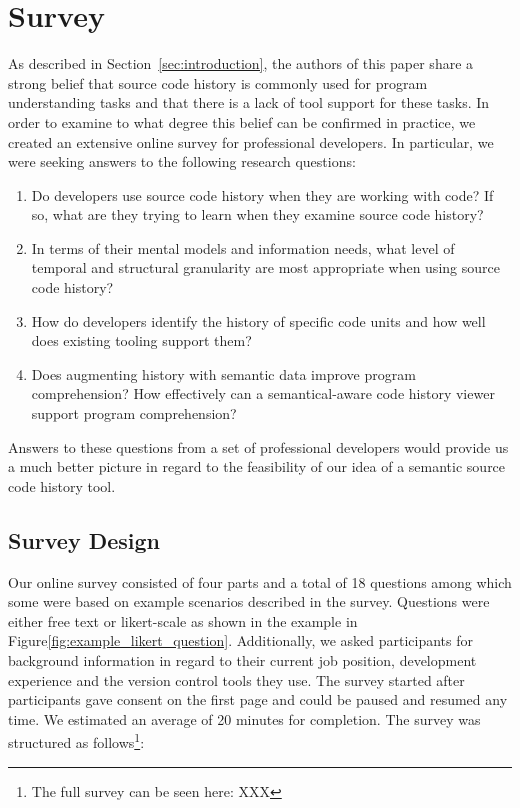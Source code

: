 
\section{Survey}
\label{sec:survey}

As described in Section~\ref{sec:introduction}, the authors of this paper share a strong belief that source code history is commonly used for program understanding tasks and that there is a lack of tool support for these tasks. In order to examine to what degree this belief can be confirmed in practice, we created an extensive online survey for professional developers. In particular, we were seeking answers to the following research questions:

\begin{enumerate}[label=\textbf{RQ\arabic*}, labelindent=\parindent, listparindent=\parindent]
	\item Do developers use source code history when they are working with code? If so, what are they trying to learn when they examine source code history?
	\item In terms of their mental models and information needs, what level of temporal and structural granularity are most appropriate when using source code history?
	\item How do developers identify the history of specific code units and how well does existing tooling support them?
	\item Does augmenting history with semantic data improve program comprehension? How effectively can a semantical-aware code history viewer support program comprehension?
\end{enumerate}

\noindent Answers to these questions from a set of professional developers would provide us a much better picture in regard to the feasibility of our idea of a semantic source code history tool.

\subsection{Survey Design}
\label{sec:survey-design}

Our online survey consisted of four parts and a total of 18 questions among which some were based on example scenarios described in the survey. Questions were either free text or likert-scale as shown in the example in Figure\ref{fig:example_likert_question}. Additionally, we asked participants for background information in regard to their current job position, development experience and the version control tools they use. The survey started after participants gave consent on the first page and could be paused and resumed any time. We estimated an average of 20 minutes for completion. The survey was structured as follows\footnote{The full survey can be seen here: XXX}:

